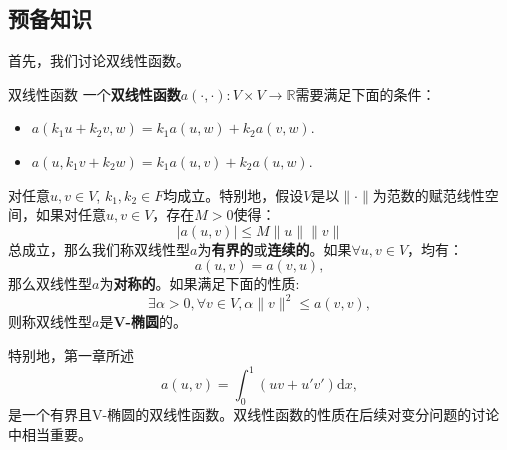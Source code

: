 \documentclass[lang=cn,10pt,newtx]{elegantbook}
\newcommand{\dif}{\mathrm{d}}
\newcommand{\norm}[1]{\|#1\|}
\begin{document}
\subsection{预备知识}
首先，我们讨论双线性函数。
\begin{definition}{双线性函数}
  一个\textbf{双线性函数}$a(\cdot,\cdot):V\times V\rightarrow\mathbb{R}$需要满足下面的条件：
  \begin{itemize}
    \item $a(k_{1}u+k_{2}v,w)=k_{1}a(u,w)+k_{2}a(v,w)$.
    \item $a(u,k_{1}v+k_{2}w)=k_{1}a(u,v)+k_{2}a(u,w)$.
  \end{itemize}
  对任意$u,v\in V$, $k_{1},k_{2}\in F$均成立。特别地，假设$V$是以$\norm{\cdot}$为范数的赋范线性空间，如果对任意$u,v\in V$，存在$M>0$使得：
  \begin{equation}
    \label{eq:bddbilinear}
    |a(u,v)|\le M\norm{u}\norm{v}
  \end{equation}
  总成立，那么我们称双线性型$a$为\textbf{有界的}或\textbf{连续的}。如果$\forall u,v\in V$，均有：
  \begin{equation}
    \label{eq:symmetrybilinear}
    a(u,v)=a(v,u),
  \end{equation}
  那么双线性型$a$为\textbf{对称的}。如果满足下面的性质:
  \begin{equation}
    \label{eq:Vellipticbilinear}
    \exists\alpha>0,\forall v\in V, \alpha\norm{v}^{2}\le a(v,v),
  \end{equation}
  则称双线性型$a$是\textbf{V-椭圆}的。
\end{definition}
特别地，第一章所述
\begin{equation}
  \label{eq:specialbilinear}
  a(u,v)=\int_{0}^{1}(uv+u'v')\dif x,
\end{equation}
是一个有界且V-椭圆的双线性函数。双线性函数的性质在后续对变分问题的讨论中相当重要。
\end{document}
